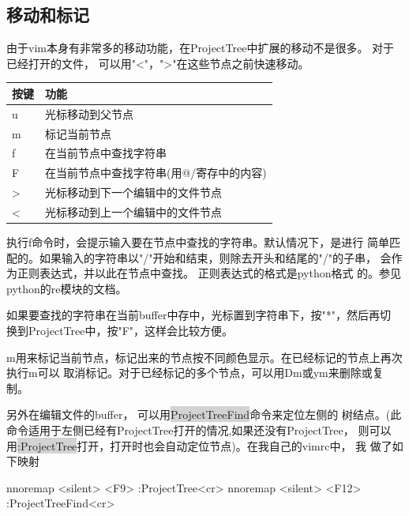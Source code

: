 \documentclass[oneside,openany]{book}
\begin{document}
  \subsection{移动和标记}
  由于vim本身有非常多的移动功能，在ProjectTree中扩展的移动不是很多。 对于已经打开的文件，
可以用"<"，">"在这些节点之前快速移动。
  \begin{table}[H]
  \centering
      \begin{tabular}{p{40pt}p{220pt}}
        \toprule
        按键& 功能\\
        \midrule
          u     &光标移动到父节点\\
          m     &标记当前节点\\
          f     &在当前节点中查找字符串\\
          F     &在当前节点中查找字符串(用@/寄存中的内容)\\
          >     &光标移动到下一个编辑中的文件节点\\
          <     &光标移动到上一个编辑中的文件节点\\
      \bottomrule
      \end{tabular}
  \end{table}
  执行f命令时，会提示输入要在节点中查找的字符串。默认情况下，是进行
简单匹配的。如果输入的字符串以"/"开始和结束，则除去开头和结尾的"/"的子串，
会作为正则表达式，并以此在节点中查找。 正则表达式的格式是python格式
的。参见python的re模块的文档。

  如果要查找的字符串在当前buffer中存中，光标置到字符串下，按"*"，然后再切
换到ProjectTree中，按"F"，这样会比较方便。

  m用来标记当前节点，标记出来的节点按不同颜色显示。在已经标记的节点上再次执行m可以
取消标记。对于已经标记的多个节点，可以用Dm或ym来删除或复制。

  另外在编辑文件的buffer， 可以用\colorbox{lightgray}{ProjectTreeFind}命令来定位左侧的
树结点。(此命令适用于左侧已经有ProjectTree打开的情况,如果还没有ProjectTree，
则可以用\colorbox{lightgray}{:ProjectTree}打开，打开时也会自动定位节点)。在我自己的vimrc中， 我
做了如下映射
  \begin{mdframed}[style=SmallFrame]
    \begin{flushleft}
      nnoremap <silent> <F9>  :ProjectTree<cr>\newline
      nnoremap <silent> <F12> :ProjectTreeFind<cr>
    \end{flushleft}
  \end{mdframed}
\end{document}
